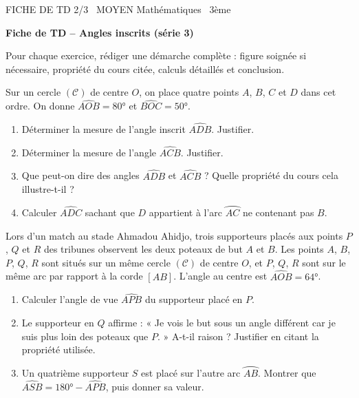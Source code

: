 \documentclass[11pt]{article}
\begin{document}
\begin{tcolorbox}[enhanced,colback=popink,colframe=popink,arc=10pt,boxrule=0pt,left=12pt,right=12pt,top=9pt,bottom=9pt]
{\color{white}\popxbold\small FICHE DE TD 2/3 \textbullet\ MOYEN \hfill Mathématiques \textbullet\ 3ème\par}
\end{tcolorbox}
\vspace{4pt}
\textbf{Fiche de TD -- Angles inscrits (série 3)}

Pour chaque exercice, rédiger une démarche complète : figure soignée si nécessaire, propriété du cours citée, calculs détaillés et conclusion.

\begin{exercice}
Sur un cercle $(\mathcal{C})$ de centre $O$, on place quatre points $A$, $B$, $C$ et $D$ dans cet ordre. On donne $\widehat{AOB} = 80°$ et $\widehat{BOC} = 50°$.
\begin{enumerate}
\item Déterminer la mesure de l'angle inscrit $\widehat{ADB}$. Justifier.
\item Déterminer la mesure de l'angle $\widehat{ACB}$. Justifier.
\item Que peut-on dire des angles $\widehat{ADB}$ et $\widehat{ACB}$ ? Quelle propriété du cours cela illustre-t-il ?
\item Calculer $\widehat{ADC}$ sachant que $D$ appartient à l'arc $\wideparen{AC}$ ne contenant pas $B$.
\end{enumerate}
\end{exercice}

\begin{exercice}
Lors d'un match au stade Ahmadou Ahidjo, trois supporteurs placés aux points $P$, $Q$ et $R$ des tribunes observent les deux poteaux de but $A$ et $B$. Les points $A$, $B$, $P$, $Q$, $R$ sont situés sur un même cercle $(\mathcal{C})$ de centre $O$, et $P$, $Q$, $R$ sont sur le même arc par rapport à la corde $[AB]$. L'angle au centre est $\widehat{AOB} = 64°$.
\begin{enumerate}
\item Calculer l'angle de vue $\widehat{APB}$ du supporteur placé en $P$.
\item Le supporteur en $Q$ affirme : « Je vois le but sous un angle différent car je suis plus loin des poteaux que $P$. » A-t-il raison ? Justifier en citant la propriété utilisée.
\item Un quatrième supporteur $S$ est placé sur l'autre arc $\wideparen{AB}$. Montrer que $\widehat{ASB} = 180° - \widehat{APB}$, puis donner sa valeur.
\end{enumerate}
\end{exercice}
\end{document}
